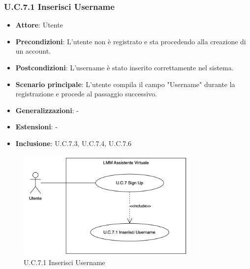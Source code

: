 \subsubsection{U.C.7.1 Inserisci Username}
\begin{itemize}
    \item \textbf{Attore}: Utente
    \item \textbf{Precondizioni}: L'utente non è registrato e sta procedendo alla creazione di un account.
    \item \textbf{Postcondizioni}: L'username è stato inserito correttamente nel sistema.
    \item \textbf{Scenario principale}: L'utente compila il campo "Username" durante la registrazione e procede al passaggio successivo.
    \item \textbf{Generalizzazioni}: -
    \item \textbf{Estensioni}: -
    \item \textbf{Inclusione}: U.C.7.3, U.C.7.4, U.C.7.6
\end{itemize}
\begin{figure}[H]
    \centering
    \includegraphics[width=0.8\textwidth]{img/UC7.1.png}
    \caption{U.C.7.1 Inserisci Username}
\end{figure}
\newpage

